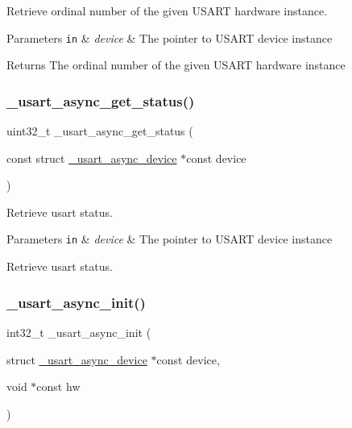 Retrieve ordinal number of the given U\+S\+A\+RT hardware instance. 


\begin{DoxyParams}[1]{Parameters}
\mbox{\tt in}  & {\em device} & The pointer to U\+S\+A\+RT device instance\\
\hline
\end{DoxyParams}
\begin{DoxyReturn}{Returns}
The ordinal number of the given U\+S\+A\+RT hardware instance 
\end{DoxyReturn}
\mbox{\label{group___h_p_l_ga09d708dc23dacf358d3de8a3a0545c1a}} 
\subsubsection{\texorpdfstring{\+\_\+usart\+\_\+async\+\_\+get\+\_\+status()}{\_usart\_async\_get\_status()}}
{\footnotesize\ttfamily uint32\+\_\+t \+\_\+usart\+\_\+async\+\_\+get\+\_\+status (\begin{DoxyParamCaption}\item[{const struct \hyperlink{struct__usart__async__device}{\+\_\+usart\+\_\+async\+\_\+device} $\ast$const}]{device }\end{DoxyParamCaption})}



Retrieve usart status. 


\begin{DoxyParams}[1]{Parameters}
\mbox{\tt in}  & {\em device} & The pointer to U\+S\+A\+RT device instance\\
\hline
\end{DoxyParams}
Retrieve usart status. \mbox{\label{group___h_p_l_ga11745e0bd0c9d636afbefae8e209665e}} 
\subsubsection{\texorpdfstring{\+\_\+usart\+\_\+async\+\_\+init()}{\_usart\_async\_init()}}
{\footnotesize\ttfamily int32\+\_\+t \+\_\+usart\+\_\+async\+\_\+init (\begin{DoxyParamCaption}\item[{struct \hyperlink{struct__usart__async__device}{\+\_\+usart\+\_\+async\+\_\+device} $\ast$const}]{device,  }\item[{void $\ast$const}]{hw }\end{DoxyParamCaption})}



